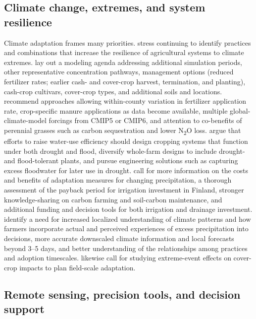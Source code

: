 \subsection{Climate change, extremes, and system resilience}

Climate adaptation frames many priorities. \textcite{Saha2024} stress continuing to identify practices and combinations that increase the resilience of agricultural systems to climate extremes. \textcite{Malone2020} lay out a modeling agenda addressing additional simulation periods, other representative concentration pathways, management options (reduced fertilizer rates; earlier cash- and cover-crop harvest, termination, and planting), cash-crop cultivars, cover-crop types, and additional soils and locations. \textcite{Ferin2023} recommend approaches allowing within-county variation in fertilizer application rate, crop-specific manure applications as data become available, multiple global-climate-model forcings from CMIP5 or CMIP6, and attention to co-benefits of perennial grasses such as carbon sequestration and lower N\textsubscript{2}O loss. \textcite{Dietzel2016} argue that efforts to raise water-use efficiency should design cropping systems that function under both drought and flood, diversify whole-farm designs to include drought- and flood-tolerant plants, and pursue engineering solutions such as capturing excess floodwater for later use in drought. \textcite{PeltonenSainio2021} call for more information on the costs and benefits of adaptation measures for changing precipitation, a thorough assessment of the payback period for irrigation investment in Finland, stronger knowledge-sharing on carbon farming and soil-carbon maintenance, and additional funding and decision tools for both irrigation and drainage investment. \textcite{Morton2015} identify a need for increased localized understanding of climate patterns and how farmers incorporate actual and perceived experiences of excess precipitation into decisions, more accurate downscaled climate information and local forecasts beyond 3--5 days, and better understanding of the relationships among practices and adoption timescales. \textcite{Gupta2023b} likewise call for studying extreme-event effects on cover-crop impacts to plan field-scale adaptation.

\subsection{Remote sensing, precision tools, and decision support}

